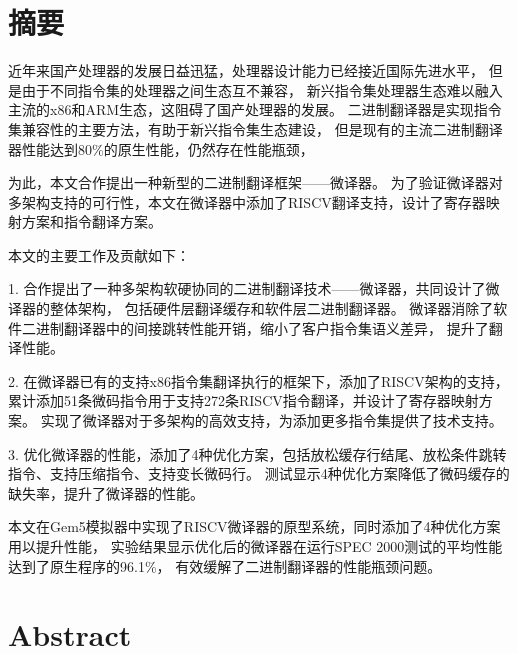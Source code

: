 \maketitle%
\MAKETITLE%
\makedeclaration%
\intobmk\chapter*{摘\quad 要}%
\setcounter{page}{1}%

近年来国产处理器的发展日益迅猛，处理器设计能力已经接近国际先进水平，
但是由于不同指令集的处理器之间生态互不兼容，
新兴指令集处理器生态难以融入主流的x86和ARM生态，这阻碍了国产处理器的发展。
二进制翻译器是实现指令集兼容性的主要方法，有助于新兴指令集生态建设，
但是现有的主流二进制翻译器性能达到80\%的原生性能，仍然存在性能瓶颈，

为此，本文合作提出一种新型的二进制翻译框架——微译器。
为了验证微译器对多架构支持的可行性，本文在微译器中添加了RISCV翻译支持，设计了寄存器映射方案和指令翻译方案。

本文的主要工作及贡献如下：

1. 合作提出了一种多架构软硬协同的二进制翻译技术——微译器，共同设计了微译器的整体架构，
包括硬件层翻译缓存和软件层二进制翻译器。
微译器消除了软件二进制翻译器中的间接跳转性能开销，缩小了客户指令集语义差异，
提升了翻译性能。

2. 在微译器已有的支持x86指令集翻译执行的框架下，添加了RISCV架构的支持，
累计添加51条微码指令用于支持272条RISCV指令翻译，并设计了寄存器映射方案。
实现了微译器对于多架构的高效支持，为添加更多指令集提供了技术支持。

3. 优化微译器的性能，添加了4种优化方案，包括放松缓存行结尾、放松条件跳转指令、支持压缩指令、支持变长微码行。
测试显示4种优化方案降低了微码缓存的缺失率，提升了微译器的性能。

本文在Gem5模拟器中实现了RISCV微译器的原型系统，同时添加了4种优化方案用以提升性能，
实验结果显示优化后的微译器在运行SPEC 2000测试的平均性能达到了原生程序的96.1\%，
有效缓解了二进制翻译器的性能瓶颈问题。

\intobmk\chapter*{Abstract}%

